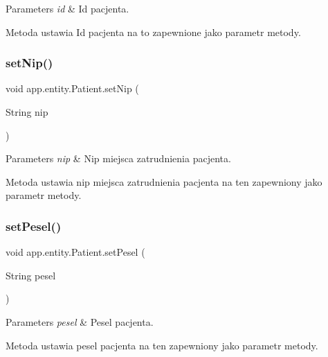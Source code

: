 \begin{DoxyParams}{Parameters}
{\em id} & Id pacjenta.\\
\hline
\end{DoxyParams}
Metoda ustawia Id pacjenta na to zapewnione jako parametr metody. \mbox{\label{classapp_1_1entity_1_1_patient_a2e0fc43a5907b274184772864f34b06f}} 
\subsubsection{\texorpdfstring{setNip()}{setNip()}}
{\footnotesize\ttfamily void app.\+entity.\+Patient.\+set\+Nip (\begin{DoxyParamCaption}\item[{String}]{nip }\end{DoxyParamCaption})}


\begin{DoxyParams}{Parameters}
{\em nip} & Nip miejsca zatrudnienia pacjenta.\\
\hline
\end{DoxyParams}
Metoda ustawia nip miejsca zatrudnienia pacjenta na ten zapewniony jako parametr metody. \mbox{\label{classapp_1_1entity_1_1_patient_aa9b9096f3ea49148b27a6fad04c1c11a}} 
\subsubsection{\texorpdfstring{setPesel()}{setPesel()}}
{\footnotesize\ttfamily void app.\+entity.\+Patient.\+set\+Pesel (\begin{DoxyParamCaption}\item[{String}]{pesel }\end{DoxyParamCaption})}


\begin{DoxyParams}{Parameters}
{\em pesel} & Pesel pacjenta.\\
\hline
\end{DoxyParams}
Metoda ustawia pesel pacjenta na ten zapewniony jako parametr metody. \mbox{\label{classapp_1_1entity_1_1_patient_a6ea42bebd9ee9d780ecc8abcb349641c}} 
